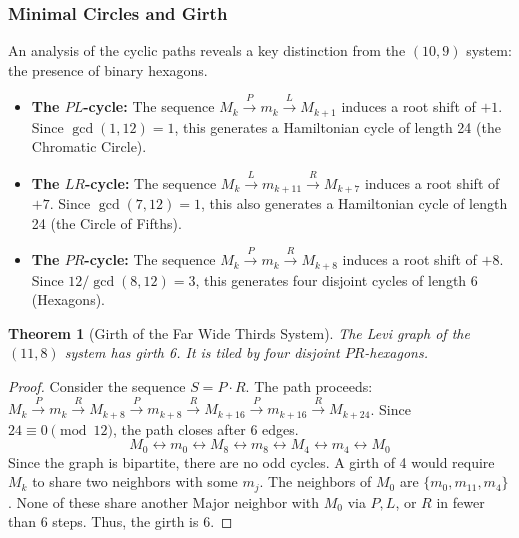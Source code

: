 \documentclass[12pt,letterpaper]{amsart}
\newtheorem{theorem}{Theorem}
\begin{document}
\subsubsection{Minimal Circles and Girth}
An analysis of the cyclic paths reveals a key distinction from the $(10,9)$ system: the presence of binary hexagons.

\begin{itemize}
    \item \textbf{The $PL$-cycle:} The sequence $M_k \xrightarrow{P} m_k \xrightarrow{L} M_{k+1}$ induces a root shift of $+1$. Since $\gcd(1, 12)=1$, this generates a Hamiltonian cycle of length 24 (the Chromatic Circle).
    \item \textbf{The $LR$-cycle:} The sequence $M_k \xrightarrow{L} m_{k+11} \xrightarrow{R} M_{k+7}$ induces a root shift of $+7$. Since $\gcd(7,12)=1$, this also generates a Hamiltonian cycle of length 24 (the Circle of Fifths).
    \item \textbf{The $PR$-cycle:} The sequence $M_k \xrightarrow{P} m_k \xrightarrow{R} M_{k+8}$ induces a root shift of $+8$. Since $12/\gcd(8,12)=3$, this generates four disjoint cycles of length 6 (Hexagons).
\end{itemize}

\begin{theorem}[Girth of the Far Wide Thirds System]
The Levi graph of the $(11,8)$ system has girth 6. It is tiled by four disjoint $PR$-hexagons.
\end{theorem}

\begin{proof}
Consider the sequence $S = P \cdot R$. The path proceeds:
$M_k \xrightarrow{P} m_k \xrightarrow{R} M_{k+8} \xrightarrow{P} m_{k+8} \xrightarrow{R} M_{k+16} \xrightarrow{P} m_{k+16} \xrightarrow{R} M_{k+24}$.
Since $24 \equiv 0 \pmod{12}$, the path closes after 6 edges.
\[ M_0 \leftrightarrow m_0 \leftrightarrow M_8 \leftrightarrow m_8 \leftrightarrow M_4 \leftrightarrow m_4 \leftrightarrow M_0 \]
Since the graph is bipartite, there are no odd cycles. A girth of 4 would require $M_k$ to share two neighbors with some $m_j$. The neighbors of $M_0$ are $\{m_0, m_{11}, m_4\}$. None of these share another Major neighbor with $M_0$ via $P, L$, or $R$ in fewer than 6 steps. Thus, the girth is 6.
\end{proof}
\end{document}
